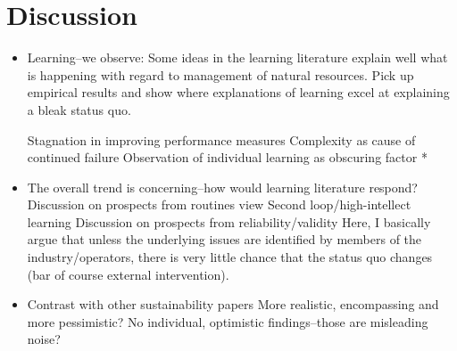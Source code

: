 	\section{Discussion}
	\begin{paracol}{2}
	\begin{itemize}
		\item Learning--we observe:
			\subitem Some ideas in the learning literature explain well what is happening with regard to management of natural resources.
		\switchcolumn Pick up empirical results and show where explanations of learning excel at explaining a bleak status quo.
		\switchcolumn*
		
			\subitem Stagnation in improving performance measures
			\subitem Complexity as cause of continued failure
			\subitem Observation of individual learning as obscuring factor
			\switchcolumn[0]*
		
		\item The overall trend is concerning--how would learning literature respond?
			\subitem Discussion on prospects from routines view
				\subsubitem Second loop/high-intellect learning
			\subitem Discussion on prospects from reliability/validity	
		\switchcolumn Here, I basically argue that unless the underlying issues are identified by members of the industry/operators, there is very little chance that the status quo changes (bar of course external intervention).
		\switchcolumn*
		
		\item Contrast with other sustainability papers
			\subitem More realistic, encompassing and more pessimistic?
			\subitem No individual, optimistic findings--those are misleading noise?
	\end{itemize}
	\end{paracol}
